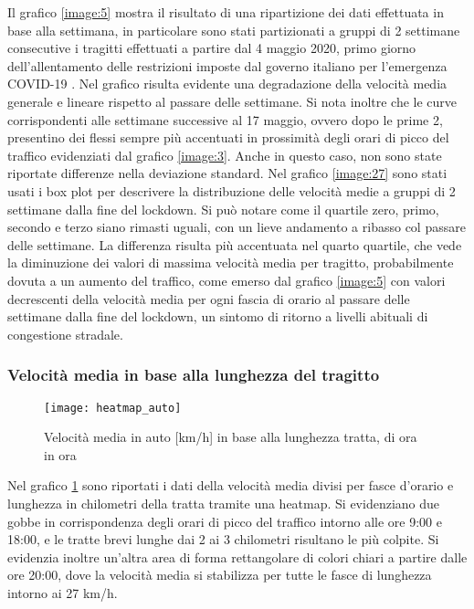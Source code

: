 Il grafico \ref{image:5} mostra il risultato di una ripartizione dei dati effettuata in base alla settimana, in particolare sono stati partizionati a gruppi di 2 settimane consecutive i tragitti effettuati a partire dal 4 maggio 2020, primo giorno dell'allentamento delle restrizioni imposte dal governo italiano per l'emergenza COVID-19 \cite{misuredelgovernopercovid}. Nel grafico risulta evidente una degradazione della velocità media generale e lineare rispetto al passare delle settimane. Si nota inoltre che le curve corrispondenti alle settimane successive al 17 maggio, ovvero dopo le prime 2, presentino dei flessi sempre più accentuati in prossimità degli orari di picco del traffico evidenziati dal grafico \ref{image:3}. Anche in questo caso, non sono state riportate differenze nella deviazione standard.
Nel grafico \ref{image:27} sono stati usati i box plot per descrivere la distribuzione delle velocità medie a gruppi di 2 settimane dalla fine del lockdown. Si può notare come il quartile zero, primo, secondo e terzo siano rimasti uguali, con un lieve andamento a ribasso col passare delle settimane. La differenza risulta più accentuata nel quarto quartile, che vede la diminuzione dei valori di massima velocità media per tragitto, probabilmente dovuta a un aumento del traffico, come emerso dal grafico \ref{image:5} con valori decrescenti della velocità media per ogni fascia di orario al passare delle settimane dalla fine del lockdown, un sintomo di ritorno a livelli abituali di congestione stradale.

\subsubsection{Velocità media in base alla lunghezza del tragitto}

\begin{figure}[H]
\texttt{[image: heatmap\_auto]}
\caption{Velocità media in auto [km/h] in base alla lunghezza tratta, di ora in ora}
\label{image:6}
\end{figure}

Nel grafico \ref{image:6} sono riportati i dati della velocità media divisi per fasce d'orario e lunghezza in chilometri della tratta tramite una heatmap. Si evidenziano due gobbe in corrispondenza degli orari di picco del traffico intorno alle ore 9:00 e 18:00, e le tratte brevi lunghe dai 2 ai 3 chilometri risultano le più colpite. Si evidenzia inoltre un'altra area di forma rettangolare di colori chiari a partire dalle ore 20:00, dove la velocità media si stabilizza per tutte le fasce di lunghezza intorno ai 27 km/h.

